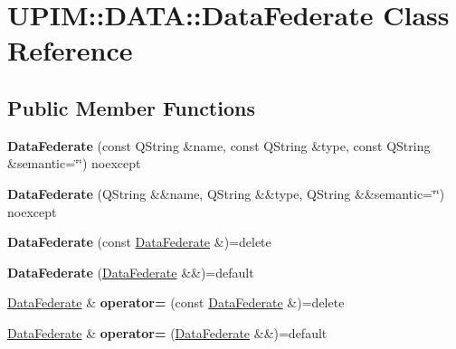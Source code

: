 \hypertarget{classUPIM_1_1DATA_1_1DataFederate}{}\section{U\+P\+IM\+:\+:D\+A\+TA\+:\+:Data\+Federate Class Reference}
\label{classUPIM_1_1DATA_1_1DataFederate}
\subsection*{Public Member Functions}
\begin{DoxyCompactItemize}
\item 
\mbox{\label{classUPIM_1_1DATA_1_1DataFederate_a4d8e42dbe6fab81bbcc34972cdb62906}} 
{\bfseries Data\+Federate} (const Q\+String \&name, const Q\+String \&type, const Q\+String \&semantic=\char`\"{}\char`\"{}) noexcept
\item 
\mbox{\label{classUPIM_1_1DATA_1_1DataFederate_ab64359155c624b461809918bf5dd6949}} 
{\bfseries Data\+Federate} (Q\+String \&\&name, Q\+String \&\&type, Q\+String \&\&semantic=\char`\"{}\char`\"{}) noexcept
\item 
\mbox{\label{classUPIM_1_1DATA_1_1DataFederate_a285273d54ca11a27f4b446c845ebde15}} 
{\bfseries Data\+Federate} (const \hyperlink{classUPIM_1_1DATA_1_1DataFederate}{Data\+Federate} \&)=delete
\item 
\mbox{\label{classUPIM_1_1DATA_1_1DataFederate_a37b50d9064aaa9c8ed0e21fe7b3d28df}} 
{\bfseries Data\+Federate} (\hyperlink{classUPIM_1_1DATA_1_1DataFederate}{Data\+Federate} \&\&)=default
\item 
\mbox{\label{classUPIM_1_1DATA_1_1DataFederate_ae9f80a7ee6f4117b5ed07277523fba59}} 
\hyperlink{classUPIM_1_1DATA_1_1DataFederate}{Data\+Federate} \& {\bfseries operator=} (const \hyperlink{classUPIM_1_1DATA_1_1DataFederate}{Data\+Federate} \&)=delete
\item 
\mbox{\label{classUPIM_1_1DATA_1_1DataFederate_a6c6208f618028e29e77ac37fa7242483}} 
\hyperlink{classUPIM_1_1DATA_1_1DataFederate}{Data\+Federate} \& {\bfseries operator=} (\hyperlink{classUPIM_1_1DATA_1_1DataFederate}{Data\+Federate} \&\&)=default

\end{DoxyCompactItemize}
